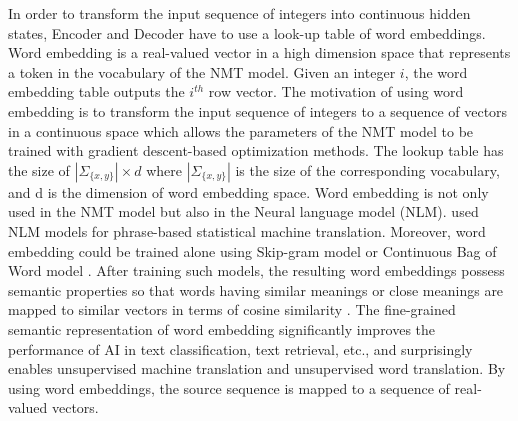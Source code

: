 In order to transform the input sequence of integers into continuous hidden states, Encoder and Decoder have to use a look-up table of word embeddings. Word embedding is a real-valued vector in a high dimension space that represents a token in the vocabulary of the NMT model. Given an integer $i$, the word embedding table outputs the $i^{th}$ row vector. The motivation of using word embedding is to transform the input sequence of integers to a sequence of vectors in a continuous space which allows the parameters of the NMT model to be trained with gradient descent-based optimization methods. The lookup table has the size of $|\Sigma_{\{x,y\}}| \times d$ where $|\Sigma_{\{x,y\}}|$ is the size of the corresponding vocabulary, and d is the dimension of word embedding space. Word embedding is not only used in the NMT model but also in the Neural language model \citep{Bengio03aneural}(NLM). \citet{Le12continuous, Schwenk12continuous} used NLM models for phrase-based statistical machine translation. Moreover, word embedding could be trained alone using Skip-gram model \citep{Mikolov13distributed} or Continuous Bag of Word model \citep{Mikolov13efficient}. After training such models, the resulting word embeddings possess semantic properties so that words having similar meanings or close meanings are mapped to similar vectors in terms of cosine similarity \citep{Collobert11natural, Mikolov13distributed, collobert08aunified}. The fine-grained semantic representation of word embedding significantly improves the performance of AI in text classification, text retrieval, etc., and surprisingly enables unsupervised machine translation and unsupervised word translation. By using word embeddings, the source sequence is mapped to a sequence of real-valued vectors. 


